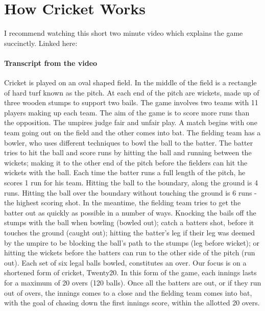 \chapter{How Cricket Works}
\label{chap: How Cricket Works}

I recommend watching this short two minute video which explains the game succinctly. Linked here: \cite{global_news_cricket_2019}

\subsubsection{Transcript from the video}

Cricket is played on an oval shaped field. In the middle of the field is a rectangle of hard turf known as the pitch. At each end of the pitch are wickets, made up of three wooden stumps to support two bails. The game involves two teams with 11 players making up each team. The aim of the game is to score more runs than the opposition. The umpires judge fair and unfair play. A match begins with one team going out on the field and the other comes into bat. The fielding team has a bowler, who uses different techniques to bowl the ball to the batter. The batter tries to hit the ball and score runs by hitting the ball and running between the wickets; making it to the other end of the pitch before the fielders can hit the wickets with the ball. Each time the batter runs a full length of the pitch, he scores 1 run for his team. Hitting the ball to the boundary, along the ground is 4 runs. Hitting the ball over the boundary without touching the ground is 6 runs - the highest scoring shot. In the meantime, the fielding team tries to get the batter out as quickly as possible in a number of ways. Knocking the bails off the stumps with the ball when bowling (bowled out); catch a batters shot, before it touches the ground (caught out); hitting the batter's leg if their leg was deemed by the umpire to be blocking the ball's path to the stumps (leg before wicket); or hitting the wickets before the batters can run to the other side of the pitch (run out). Each set of six legal balls bowled, constitutes an over. Our focus is on a shortened form of cricket, Twenty20. In this form of the game, each innings lasts for a maximum of 20 overs (120 balls). Once all the batters are out, or if they run out of overs, the innings comes to a close and the fielding team comes into bat, with the goal of chasing down the first innings score, within the allotted 20 overs.